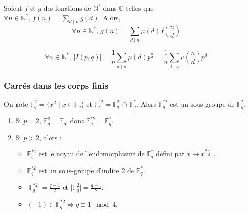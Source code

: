   \begin{theorem}
    Soient $f$ et $g$ des fonctions de $\mathbb{N}^*$ dans $\mathbb{C}$ telles que $\forall n \in \mathbb{N}^*, \, f(n) = \sum_{d \mid n} g(d)$. Alors,
    \[ \forall n \in \mathbb{N}^*, \, g(n) = \sum_{d \mid n} \mu(d) f \left( \frac{n}{d} \right) \]
  \end{theorem}
  
  \begin{corollary}
    \[ \forall n \in \mathbb{N}^*, \, \vert I(p,q) \vert = \frac{1}{n} \sum_{d \mid n} \mu(d) p^{\frac{n}{d}} = \frac{1}{n} \sum_{d \mid n} \mu \left( \frac{n}{d} \right) p^{d} \]
  \end{corollary}
  
  \subsubsection{Carrés dans les corps finis}
  
  
  \begin{proposition}
    On note $\mathbb{F}_q^2 = \{ x^2 \mid x \in \mathbb{F}_q \}$ et $\mathbb{F}_q^{*2} = \mathbb{F}_q^2 \, \cap \, \mathbb{F}_q^*$. Alors $\mathbb{F}_q^{*2}$ est un sous-groupe de $\mathbb{F}_q^*$.
  \end{proposition}
  
  \begin{proposition}
    \begin{enumerate}[label=(\roman*)]
      \item Si $p = 2$, $\mathbb{F}_q^2 = \mathbb{F}_q$, donc $\mathbb{F}_q^{*2} = \mathbb{F}_q^*$.
      \item Si $p > 2$, alors :
      \begin{itemize}
        \item $\mathbb{F}_q^{*2}$ est le noyau de l'endomorphisme de $\mathbb{F}_q^*$ défini par $x \mapsto x^{\frac{q-1}{2}}$.
        \item $\mathbb{F}_q^{*2}$ est un sous-groupe d'indice $2$ de $\mathbb{F}_q^*$.
        \item $\vert \mathbb{F}_q^{*2} \vert = \frac{q-1}{2}$ et $\vert \mathbb{F}_q^2 \vert = \frac{q+1}{2}$.
        \item $(-1) \in \mathbb{F}_q^{*2} \iff q \equiv 1 \mod 4$.
      \end{itemize}
    \end{enumerate}
  \end{proposition}
  
